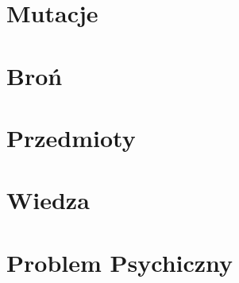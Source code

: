 \section{Mutacje}

\section{Broń}
\section{Przedmioty}
\section{Wiedza}
\section{Problem Psychiczny}





